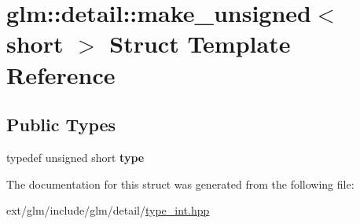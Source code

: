\hypertarget{structglm_1_1detail_1_1make__unsigned_3_01short_01_4}{\section{glm\-:\-:detail\-:\-:make\-\_\-unsigned$<$ short $>$ Struct Template Reference}
\label{structglm_1_1detail_1_1make__unsigned_3_01short_01_4}
}
\subsection*{Public Types}
\begin{DoxyCompactItemize}
\item 
\hypertarget{structglm_1_1detail_1_1make__unsigned_3_01short_01_4_a58861091aca3a68acc085131cc6fefa4}{typedef unsigned short {\bfseries type}}\label{structglm_1_1detail_1_1make__unsigned_3_01short_01_4_a58861091aca3a68acc085131cc6fefa4}

\end{DoxyCompactItemize}


The documentation for this struct was generated from the following file\-:\begin{DoxyCompactItemize}
\item 
ext/glm/include/glm/detail/\hyperlink{type__int_8hpp}{type\-\_\-int.\-hpp}\end{DoxyCompactItemize}
